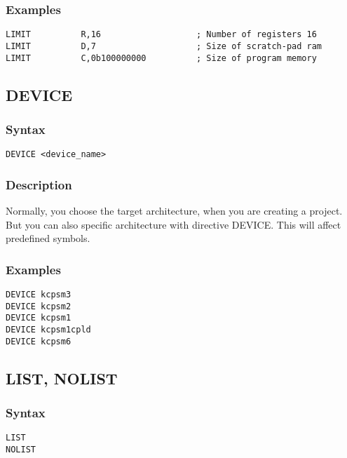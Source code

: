         \subsubsection{Examples}
            \verb'LIMIT          R,16                   ; Number of registers 16'\\
            \verb'LIMIT          D,7                    ; Size of scratch-pad ram   '\\
            \verb'LIMIT          C,0b100000000          ; Size of program memory '\\

    \subsection{DEVICE}
        \subsubsection{Syntax}
            \verb'DEVICE <device_name>'

        \subsubsection{Description}
            Normally, you choose the target architecture, when you are creating a project. But you can also specific architecture with directive DEVICE. This will affect predefined symbols.

        \subsubsection{Examples}
            \verb'DEVICE kcpsm3'\\
            \verb'DEVICE kcpsm2'\\
            \verb'DEVICE kcpsm1'\\
            \verb'DEVICE kcpsm1cpld'\\
            \verb'DEVICE kcpsm6'\\

    \subsection{LIST, NOLIST}
        \subsubsection{Syntax}
            \verb'LIST'\\
            \verb'NOLIST'

